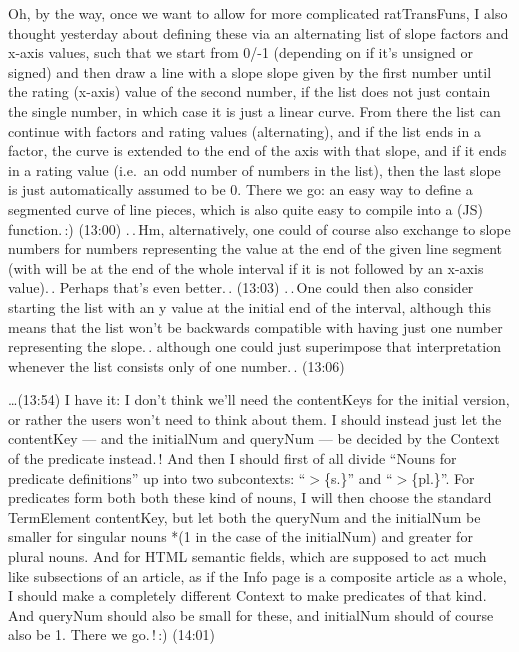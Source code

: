 \documentclass{report}
\begin{document}
Oh, by the way, once we want to allow for more complicated ratTransFuns, I also thought yesterday about defining these via an alternating list of slope factors and x-axis values, such that we start from 0/-1 (depending on if it's unsigned or signed) and then draw a line with a slope slope given by the first number until the rating (x-axis) value of the second number, if the list does not just contain the single number, in which case it is just a linear curve. From there the list can continue with factors and rating values (alternating), and if the list ends in a factor, the curve is extended to the end of the axis with that slope, and if it ends in a rating value (i.e.\ an odd number of numbers in the list), then the last slope is just automatically assumed to be 0. There we go: an easy way to define a segmented curve of line pieces, which is also quite easy to compile into a (JS) function.\,:) (13:00) .\,.\,Hm, alternatively, one could of course also exchange to slope numbers for numbers representing the value at the end of the given line segment (with will be at the end of the whole interval if it is not followed by an x-axis value).\,. Perhaps that's even better.\,. (13:03) .\,.\,One could then also consider starting the list with an y value at the initial end of the interval, although this means that the list won't be backwards compatible with having just one number representing the slope.\,. although one could just superimpose that interpretation whenever the list consists only of one number.\,. (13:06)

\ldots (13:54) I have it: I don't think we'll need the contentKeys for the initial version, or rather the users won't need to think about them. I should instead just let the contentKey --- and the initialNum and queryNum --- be decided by the Context of the predicate instead.\,! And then I should first of all divide ``Nouns for predicate definitions'' up into two subcontexts: ``$>$\{s.\}'' and ``$>$\{pl.\}''. For predicates form both both these kind of nouns, I will then choose the standard TermElement contentKey, but let both the queryNum and the initialNum be smaller for singular nouns *(1 in the case of the initialNum) and greater for plural nouns. And for HTML semantic fields, which are supposed to act much like subsections of an article, as if the Info page is a composite article as a whole, I should make a completely different Context to make predicates of that kind. And queryNum should also be small for these, and initialNum should of course also be 1. There we go.\,!\,:) (14:01)
\end{document}
